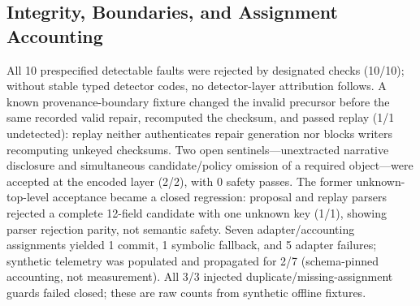 \subsection{Integrity, Boundaries, and Assignment Accounting}
All 10 prespecified detectable faults were rejected by designated checks (10/10); without stable typed detector codes, no detector-layer attribution follows. A known provenance-boundary fixture changed the invalid precursor before the same recorded valid repair, recomputed the checksum, and passed replay (1/1 undetected): replay neither authenticates repair generation nor blocks writers recomputing unkeyed checksums. Two open sentinels---unextracted narrative disclosure and simultaneous candidate/policy omission of a required object---were accepted at the encoded layer (2/2), with 0 safety passes. The former unknown-top-level acceptance became a closed regression: proposal and replay parsers rejected a complete 12-field candidate with one unknown key (1/1), showing parser rejection parity, not semantic safety. Seven adapter/accounting assignments yielded 1 commit, 1 symbolic fallback, and 5 adapter failures; synthetic telemetry was populated and propagated for 2/7 (schema-pinned accounting, not measurement). All 3/3 injected duplicate/missing-assignment guards failed closed; these are raw counts from synthetic offline fixtures.
